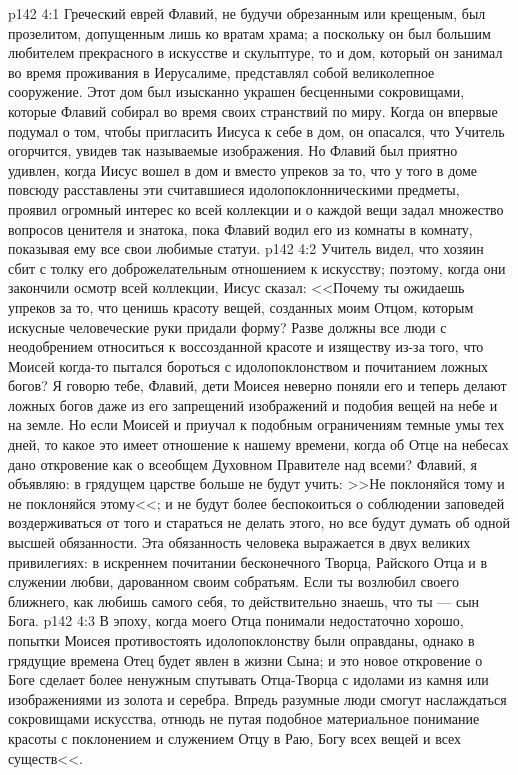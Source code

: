 \vs p142 4:1 Греческий еврей Флавий, не будучи обрезанным или крещеным, был прозелитом, допущенным лишь ко вратам храма; а поскольку он был большим любителем прекрасного в искусстве и скульптуре, то и дом, который он занимал во время проживания в Иерусалиме, представлял собой великолепное сооружение. Этот дом был изысканно украшен бесценными сокровищами, которые Флавий собирал во время своих странствий по миру. Когда он впервые подумал о том, чтобы пригласить Иисуса к себе в дом, он опасался, что Учитель огорчится, увидев так называемые изображения. Но Флавий был приятно удивлен, когда Иисус вошел в дом и вместо упреков за то, что у того в доме повсюду расставлены эти считавшиеся идолопоклонническими предметы, проявил огромный интерес ко всей коллекции и о каждой вещи задал множество вопросов ценителя и знатока, пока Флавий водил его из комнаты в комнату, показывая ему все свои любимые статуи.
\vs p142 4:2 Учитель видел, что хозяин сбит с толку его доброжелательным отношением к искусству; поэтому, когда они закончили осмотр всей коллекции, Иисус сказал: <<Почему ты ожидаешь упреков за то, что ценишь красоту вещей, созданных моим Отцом, которым искусные человеческие руки придали форму? Разве должны все люди с неодобрением относиться к воссозданной красоте и изяществу из\hyp{}за того, что Моисей когда\hyp{}то пытался бороться с идолопоклонством и почитанием ложных богов? Я говорю тебе, Флавий, дети Моисея неверно поняли его и теперь делают ложных богов даже из его запрещений изображений и подобия вещей на небе и на земле. Но если Моисей и приучал к подобным ограничениям темные умы тех дней, то какое это имеет отношение к нашему времени, когда об Отце на небесах дано откровение как о всеобщем Духовном Правителе над всеми? Флавий, я объявляю: в грядущем царстве больше не будут учить: >>Не поклоняйся тому и не поклоняйся этому<<; и не будут более беспокоиться о соблюдении заповедей воздерживаться от того и стараться не делать этого, но все будут думать об одной высшей обязанности. Эта обязанность человека выражается в двух великих привилегиях: в искреннем почитании бесконечного Творца, Райского Отца и в служении любви, дарованном своим собратьям. Если ты возлюбил своего ближнего, как любишь самого себя, то действительно знаешь, что ты --- сын Бога.
\vs p142 4:3 В эпоху, когда моего Отца понимали недостаточно хорошо, попытки Моисея противостоять идолопоклонству были оправданы, однако в грядущие времена Отец будет явлен в жизни Сына; и это новое откровение о Боге сделает более ненужным спутывать Отца\hyp{}Творца с идолами из камня или изображениями из золота и серебра. Впредь разумные люди смогут наслаждаться сокровищами искусства, отнюдь не путая подобное материальное понимание красоты с поклонением и служением Отцу в Раю, Богу всех вещей и всех существ<<.
